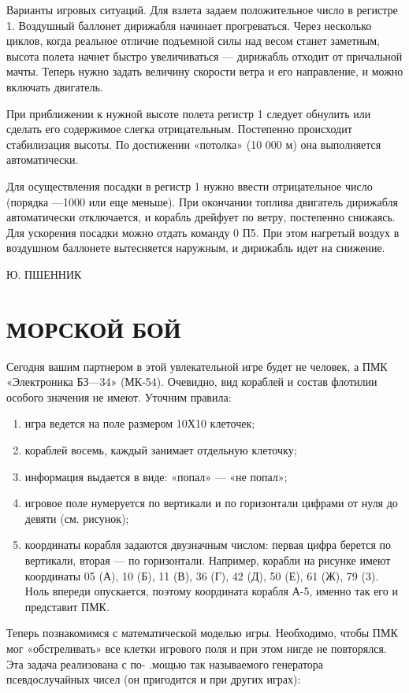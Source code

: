 \documentclass[11pt,a4paper,oneside]{article}
\begin{document}
Варианты игровых ситуаций. Для взлета задаем положительное число в регистре 1. Воздушный баллонет дирижабля начинает прогреваться. Через несколько циклов, когда реальное отличие подъемной силы над весом станет заметным, высота полета начнет быстро увеличиваться — дирижабль отходит от причальной мачты. Теперь нужно задать величину скорости ветра и его направление, и можно включать двигатель.

При приближении к нужной высоте полета регистр 1 следует обнулить или сделать его содержимое слегка отрицательным. Постепенно происходит стабилизация высоты. По достижении «потолка» (10 000 м) она выполняется автоматически.

Для осуществления посадки в регистр 1 нужно ввести отрицательное число (порядка —1000 или еще меньше). При окончании топлива двигатель дирижабля автоматически отключается, и корабль дрейфует по ветру, постепенно снижаясь. Для ускорения посадки можно отдать команду 0 П5. При этом нагретый воздух в воздушном баллонете вытесняется наружным, и дирижабль идет на снижение.

Ю. ПШЕННИК

\section{МОРСКОЙ БОЙ}
Сегодня вашим партнером в этой увлекательной игре будет не человек, а ПМК «Электроника БЗ—34» (МК-54). Очевидно, вид кораблей и состав флотилии особого значения не имеют. Уточним правила:
\begin{enumerate}
\item игра ведется на поле размером 10Х10 клеточек;
\item кораблей восемь, каждый занимает отдельную клеточку;
\item информация выдается в виде: «попал» — «не попал»;
\item игровое поле нумеруется по вертикали и по горизонтали цифрами от нуля до девяти (см. рисунок);
\item координаты корабля задаются двузначным числом: первая цифра берется по вертикали, вторая — по горизонтали. Например, корабли на рисунке имеют координаты 05 (А), 10 (Б), 11 (В), 36 (Г), 42 (Д), 50 (Е), 61 (Ж), 79 (3). Ноль впереди опускается, поэтому координата корабля А-5, именно так его и представит ПМК.
\end{enumerate}

Теперь познакомимся с математической моделью игры. Необходимо, чтобы ПМК мог «обстреливать» все клетки игрового поля и при этом нигде не повторялся. Эта задача реализована с по- .мощью так называемого генератора псевдослучайных чисел (он пригодится и при других играх):
\end{document}
